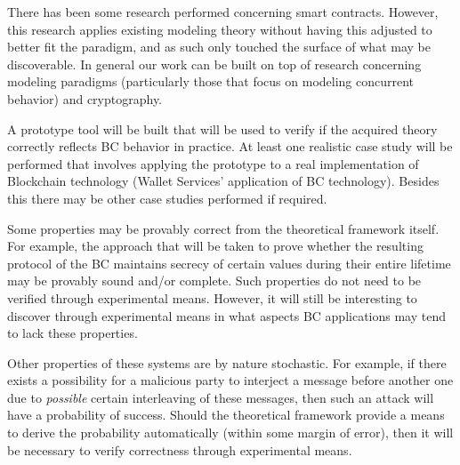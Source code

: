 \documentclass[]{article}
\begin{document}
There has been some research performed concerning smart contracts. However, this research applies existing modeling theory without having this adjusted to better fit the paradigm, and as such only touched the surface of what may be discoverable. In general our work can be built on top of research concerning modeling paradigms (particularly those that focus on modeling concurrent behavior) and cryptography.

A prototype tool will be built that will be used to verify if the acquired theory correctly reflects BC behavior in practice. At least one realistic case study will be performed that involves applying the prototype to a real implementation of Blockchain technology (Wallet Services' application of BC technology). Besides this there may be other case studies performed if required.

Some properties may be provably correct from the theoretical framework itself. For example, the approach that will be taken to prove whether the resulting protocol of the BC maintains secrecy of certain values during their entire lifetime may be provably sound and/or complete. Such properties do not need to be verified through experimental means. However, it will still be interesting to discover through experimental means in what aspects BC applications may tend to lack these properties.

Other properties of these systems are by nature stochastic. For example, if there exists a possibility for a malicious party to interject a message before another one due to \emph{possible} certain interleaving of these messages, then such an attack will have a probability of success. Should the theoretical framework provide a means to derive the probability automatically (within some margin of error), then it will be necessary to verify correctness through experimental means.
\end{document}
